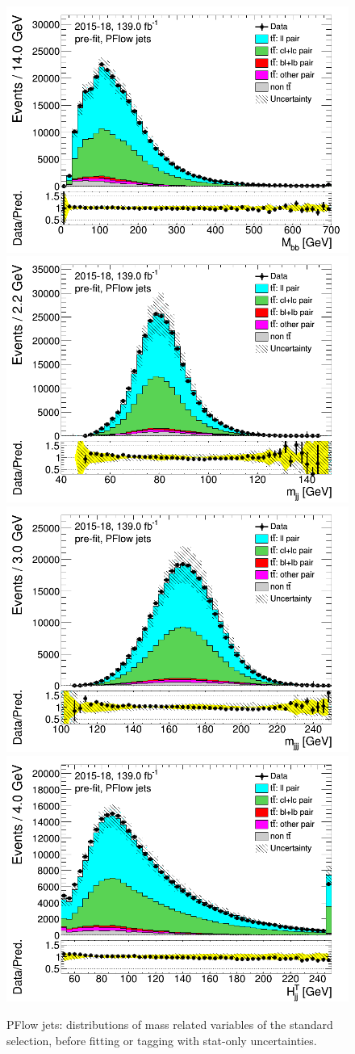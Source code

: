 \newpage
\begin{figure}[H]
\includegraphics[width=.45\textwidth]{FTAG_plots/pretagNoRwwithouthighpTPFlowall/DataMC_h_Mbb.png}
\includegraphics[width=.45\textwidth]{FTAG_plots/pretagNoRwwithouthighpTPFlowall/DataMC_h_mjj.png}\\
\includegraphics[width=.45\textwidth]{FTAG_plots/pretagNoRwwithouthighpTPFlowall/DataMC_h_mjjj.png}
\includegraphics[width=.45\textwidth]{FTAG_plots/pretagNoRwwithouthighpTPFlowall/DataMC_h_Htjj.png}\\
\caption{PFlow jets: distributions of mass related variables of the standard selection, 
before fitting or 
tagging with stat-only uncertainties.} \label{fig:standard_mass_PFlow}
\end{figure}



